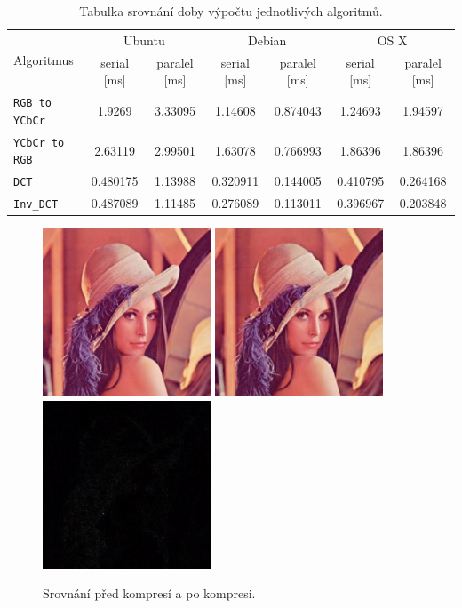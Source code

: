 \documentclass[11pt,a4paper]{article}
\begin{document}
\begin{table}[H]
\begin{center}
\renewcommand{\arraystretch}{1.3} %
\begin{tabular}{|l|cc|cc|cc|}\hline%
\multirow{2}{*}{Algoritmus}&\multicolumn{2}{|c|}{Ubuntu}&\multicolumn{2}{|c|}{Debian}&\multicolumn{2}{|c|}{OS X}\\
          &serial [ms]&paralel [ms]&serial [ms]&paralel [ms]&serial [ms]&paralel [ms]\\\hline%
\texttt{RGB to YCbCr}&1.9269&3.33095    &1.14608&0.874043   &1.24693&1.94597\\
\texttt{YCbCr to RGB}&2.63119&2.99501               &1.63078&0.766993   &1.86396&1.86396\\
\texttt{DCT}         &0.480175&1.13988  &0.320911&0.144005  &0.410795&0.264168\\
\texttt{Inv\_DCT}    &0.487089&1.11485  &0.276089&0.113011  &0.396967&0.203848\\
\hline
\end{tabular}
\renewcommand{\arraystretch}{1} %
\end{center}
\caption{Tabulka srovnání doby výpočtu jednotlivých algoritmů.}
\label{ps_history}
\end{table}

\begin{figure}[H]
  \centering
  \includegraphics[width=5cm]{sample3.pdf}
  \includegraphics[width=5cm]{sample3_out.pdf}
  \includegraphics[width=5cm]{sample3_diff.pdf}
  \caption{Srovnání před kompresí a po kompresi.}
  \label{pipeline}
\end{figure}
\end{document}
